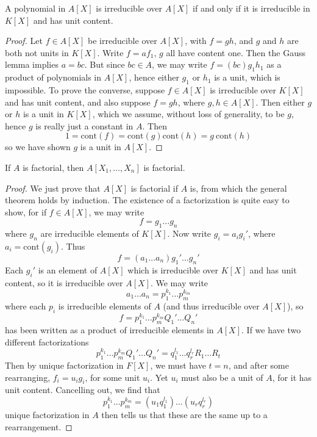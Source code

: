 \begin{corollary}
    A polynomial in $A[X]$ is irreducible over $A[X]$ if and only if it is irreducible in $K[X]$ and has unit content.
\end{corollary}
\begin{proof}
    Let $f \in A[X]$ be irreducible over $A[X]$, with $f = gh$, and $g$ and $h$ are both not units in $K[X]$. Write $f = af_1$, $g$ all have content one. Then the Gauss lemma implies $a = bc$. But since $bc \in A$, we may write $f = (bc) g_1 h_1$ as a product of polynomials in $A[X]$, hence either $g_1$ or $h_1$ is a unit, which is impossible. To prove the converse, suppose $f \in A[X]$ is irreducible over $K[X]$ and has unit content, and also suppose $f = gh$, where $g,h \in A[X]$. Then either $g$ or $h$ is a unit in $K[X]$, which we assume, without loss of generality, to be $g$, hence $g$ is really just a constant in $A$. Then
    \[ 1 = \text{cont}(f) = \text{cont}(g) \text{cont}(h) = g\ \text{cont}(h) \]
    so we have shown $g$ is a unit in $A[X]$.
\end{proof}

\begin{corollary}
    If $A$ is factorial, then $A[X_1, \dots, X_n]$ is factorial.
\end{corollary}
\begin{proof}
    We just prove that $A[X]$ is factorial if $A$ is, from which the general theorem holds by induction. The existence of a factorization is quite easy to show, for if $f \in A[X]$, we may write
    \[ f = g_1 \dots g_n \]
    where $g_n$ are irreducible elements of $K[X]$. Now write $g_i = a_i g_i'$, where $a_i = \text{cont}(g_i)$. Thus
    \[ f = (a_1 \dots a_n) g_1' \dots g_n' \]
    Each $g_i'$ is an element of $A[X]$ which is irreducible over $K[X]$ and has unit content, so it is irreducible over $A[X]$. We may write
    \[ a_1 \dots a_n = p_1^{k_1} \dots p_m^{k_m} \]
    where each $p_i$ is irreducible elements of $A$ (and thus irreducible over $A[X]$), so
    \[ f = p_1^{k_1} \dots p_m^{k_m} Q_1' \dots Q_n' \]
    has been written as a product of irreducible elements in $A[X]$. If we have two different factorizations
    \[ p_1^{k_1} \dots p_m^{k_m} Q_1' \dots Q_n' = q_1^{l_1} \dots q_r^{l_r} R_1 \dots R_t \]
    Then by unique factorization in $F[X]$, we must have $t = n$, and after some rearranging, $f_i = u_i g_i$, for some unit $u_i$. Yet $u_i$ must also be a unit of $A$, for it has unit content. Cancelling out, we find that
    \[ p_1^{k_1} \dots p_m^{k_m} = (u_1 q_1^{l_1}) \dots (u_r q_r^{l_r}) \]
    unique factorization in $A$ then tells us that these are the same up to a rearrangement.
\end{proof}

